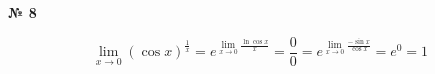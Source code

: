 \documentclass{article}
\begin{document}
\textbf{№ 8} 

\begingroup
\Large

$$ \lim\limits_{x \to 0} \left( \cos{x} \right)^{\frac{1}{x}}
= e^{\lim\limits_{x \to 0}\frac{\ln{\cos{x}}}{x}}
= \frac{0}{0}
= e^{\lim\limits_{x \to 0}\frac{-\sin{x}}{\cos{x}}}
= e^0
= 1 $$

\endgroup
\end{document}
